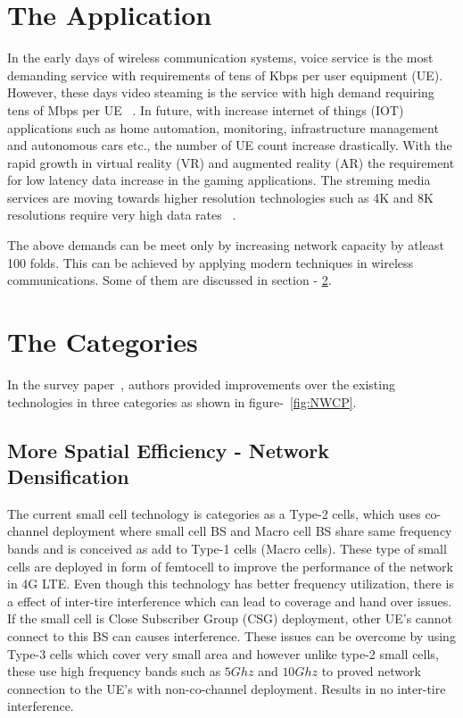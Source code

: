 \documentclass[12pt,onecolumn]{IEEEtran}
\begin{document}
\section{The Application}
\label{sec:TA}

In the early days of wireless communication systems, voice service is the most demanding service with requirements of tens of Kbps per user equipment (UE). However, these days video steaming is the service with high demand requiring tens of Mbps per UE ~\cite{stream_vid}. 
In future, with increase internet of things (IOT) applications such as home automation, monitoring, infrastructure management and autonomous cars etc., the number of UE count increase drastically. 
With the rapid growth in virtual reality (VR) and augmented reality (AR) the requirement for low latency data increase in the gaming applications. 
The streming media services are moving towards higher resolution technologies such as 4K and 8K resolutions require very high data rates ~\cite{youtube}.

The above demands can be meet only by increasing network capacity by atleast 100 folds. This can be achieved by applying modern techniques in wireless communications. Some of them are discussed in section - \ref{sec:TC}.

\section{The Categories}  
\label{sec:TC}
In the survey paper~\cite{main_paper}, authors provided improvements over the existing technologies in three categories as shown in figure-~\ref{fig:NWCP}.

\subsection{More Spatial Efficiency - Network Densification}
\label{subsec:MS}
The current small cell technology is categories as a Type-2 cells, which uses co-channel deployment where small cell BS and Macro cell BS share same frequency bands and is conceived as add to Type-1 cells (Macro cells). These type of small cells are deployed in form of femtocell to improve the performance of the network in 4G LTE. Even though this technology has better frequency utilization, there is a effect of inter-tire interference which can lead to coverage and hand over issues. If the small cell is Close Subscriber Group (CSG) deployment, other UE's cannot connect to this BS can causes interference. These issues can be overcome by using Type-3 cells which cover very small area and however unlike type-2 small cells, these use high frequency bands such as $5Ghz$ and $10Ghz$ to proved network connection to the UE's with non-co-channel deployment. Results in no inter-tire interference.
\end{document}
